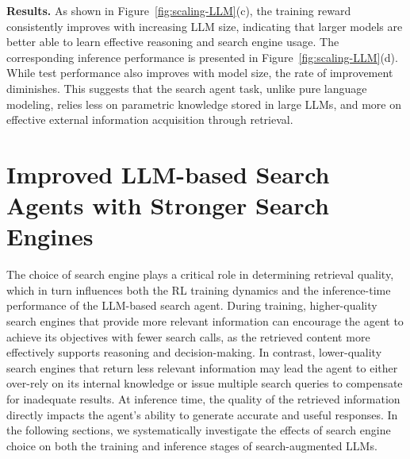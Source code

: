 \textbf{Results.}
As shown in Figure~\ref{fig:scaling-LLM}(c), the training reward consistently improves with increasing LLM size, indicating that larger models are better able to learn effective reasoning and search engine usage. 
The corresponding inference performance is presented in Figure~\ref{fig:scaling-LLM}(d). While test performance also improves with model size, the rate of improvement diminishes. This suggests that the search agent task, unlike pure language modeling, relies less on parametric knowledge stored in large LLMs, and more on effective external information acquisition through retrieval.

\section{Improved LLM-based Search Agents with Stronger Search Engines}\label{sec:search-engine}

The choice of search engine plays a critical role in determining retrieval quality, which in turn influences both the RL training dynamics and the inference-time performance of the LLM-based search agent. 
During training, higher-quality search engines that provide more relevant information can encourage the agent to achieve its objectives with fewer search calls, as the retrieved content more effectively supports reasoning and decision-making. 
In contrast, lower-quality search engines that return less relevant information may lead the agent to either over-rely on its internal knowledge or issue multiple search queries to compensate for inadequate results. 
At inference time, the quality of the retrieved information directly impacts the agent’s ability to generate accurate and useful responses. 
In the following sections, we systematically investigate the effects of search engine choice on both the training and inference stages of search-augmented LLMs.

